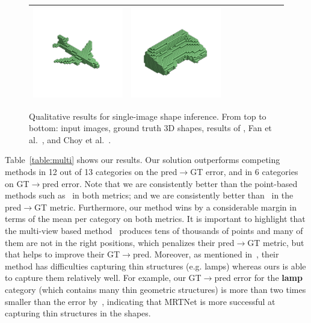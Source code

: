 \begin{figure}[t]
\begin{tabular}{c|cccccccc}
\includegraphics[width=.12\linewidth]{MRTNet/rendering/i2pc_comparison/d18592d9615b01bbbc0909d98a1ff2_r2n2_v1.png} &
\includegraphics[width=.12\linewidth]{MRTNet/rendering/i2pc_comparison/cceaeed0d8cf5bdbca68d7e2f215cb_r2n2_v1.png} \\
\hline
\end{tabular}
\vspace{-8pt}
    \caption{\label{fig:inference-comp} 
    \small Qualitative results for single-image shape inference. From top to bottom: input images, ground truth 3D shapes, results of \mrtnet, Fan et al.~\cite{fan2016point}, and Choy et al.~\cite{choy20163d}.
    }
\vspace{-12pt}
\end{figure}

Table~\ref{table:multi} shows our results. 
Our solution outperforms competing methods in 12 out of 13 categories on the pred$\to$GT error, and in
6 categories on GT$\to$pred error.
Note that we are consistently better than the point-based methods such as~\cite{fan2016point} in both metrics; 
and we are consistently better than~\cite{lin2018learning} in the pred$\to$GT metric.
Furthermore, our method wins by a considerable margin in terms of the mean per category on both metrics. 
It is important to highlight that the multi-view based method~\cite{lin2018learning} produces tens of thousands of points and many of them
are not in the right positions, which penalizes their pred$\to$GT metric, but that helps to improve their GT$\to$pred.
Moreover, as mentioned in~\cite{lin2018learning}, their method has difficulties capturing thin structures (e.g. lamps) whereas ours is able
to capture them relatively well.
For example, our GT$\to$pred error for the \textbf{lamp} category (which contains many thin geometric structures) is more than two times smaller than the error by~\cite{lin2018learning}, indicating that MRTNet is more successful at capturing thin structures in the shapes.

